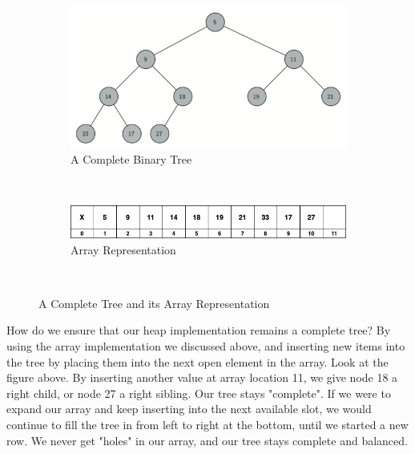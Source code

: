 \begin{figure}[h!]
	\centering
	\begin{subfigure}[b]{0.45\textwidth}
		\includegraphics[width=\textwidth]{images/compTree_3013_2020.png}
		\caption{A Complete Binary Tree}
		\label{fig:compbintree}
	\end{subfigure}\\
	\vspace{.5cm}
	\begin{subfigure}[b]{0.45\textwidth}
		\includegraphics[width=\textwidth]{images/heap_array.png}
		\caption{Array Representation}
		\label{fig:arraytreerep}
	\end{subfigure}
	~ %
	\caption{A Complete Tree and its Array Representation}\label{fig:arraybintreerep}
\end{figure}


How do we ensure that our heap implementation remains a complete tree? By using the array implementation we discussed above, and inserting new items into the tree by placing them into the next open element in the array. Look at the figure above. By inserting another value at array location 11, we give node 18 a right child, or node 27 a right sibling. Our tree stays "complete". If we were to expand our array and keep inserting into the next available slot, we would continue to fill the tree in from left to right at the bottom, until we started a new row. We never get "holes" in our array, and our tree stays complete and balanced. \\


